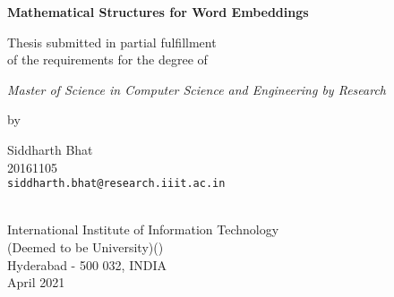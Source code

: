 \thispagestyle{empty}
\begin{center}
\vspace*{1.5cm}
{\Large \bf Mathematical Structures for Word Embeddings}

\vspace*{3.75cm}
{\large Thesis submitted in partial fulfillment\\}
{\large  of the requirements for the degree of \\}

\vspace*{1cm}
{\it {\large Master of Science in Computer Science and Engineering by Research} \\
}

\vspace*{1cm}
{\large by}

\vspace*{5mm}
{\large Siddharth Bhat\\}
{\large 20161105 \\
{\small \tt siddharth.bhat@research.iiit.ac.in }}


\vspace*{4.0cm}
{\\}
{\large International Institute of Information Technology\\}
{\large (Deemed to be University)() \\}
{\large Hyderabad - 500 032, INDIA\\}
{\large April 2021 \\}
\end{center}
